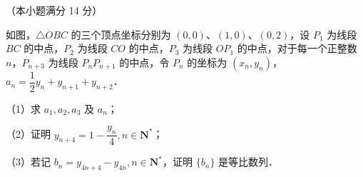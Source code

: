 \begin{question}
（本小题满分 14 分）

如图，$\triangle OBC$ 的三个顶点坐标分别为 $(0, 0)$、$(1, 0)$、$(0, 2)$，设 $P_1$ 为线段 $BC$ 的中点，$P_2$ 为线段 $CO$ 的中点，$P_3$ 为线段 $OP_1$ 的中点，对于每一个正整数 $n$，$P_{n+3}$ 为线段 $P_n P_{n+1}$ 的中点，令 $P_n$ 的坐标为 $(x_n, y_n)$，$a_n = \dfrac{1}{2}y_n + y_{n+1} + y_{n+2}$．

（1）求 $a_1, a_2, a_3$ 及 $a_n$；

（2）证明 $y_{n+4} = 1 - \dfrac{y_n}{4}, n \in \mathbf{N}^*$；

（3）若记 $b_n = y_{4n+4} - y_{4n}, n \in \mathbf{N}^*$，证明 $\{b_n\}$ 是等比数列．
\nopagebreak[4]
\begin{center}\end{center}
\nopagebreak[4]

\end{question}